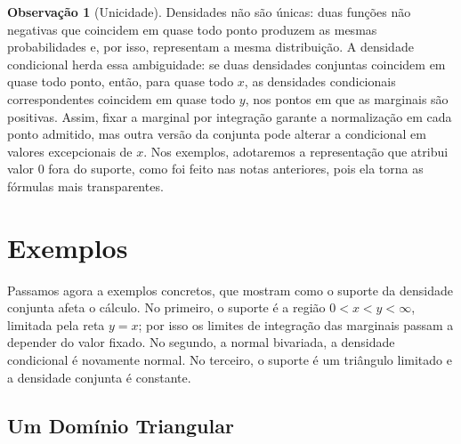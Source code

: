 \documentclass[12pt,portuguese]{article}
\theoremstyle{definition}
\newtheorem{remark}[remark]{Observação}
\theoremstyle{plainexercise}
\theoremstyle{starredexercise}
\theoremstyle{definition}
\begin{document}
\begin{remark}[Unicidade]\label{rem:unicidade-condicional}
  Densidades não são únicas: duas funções não negativas que coincidem em quase todo ponto
  produzem as mesmas probabilidades e, por isso, representam a mesma distribuição. A
  densidade condicional herda essa ambiguidade: se duas densidades conjuntas coincidem em
  quase todo ponto, então, para quase todo $x$, as densidades condicionais correspondentes
  coincidem em quase todo $y$, nos pontos em que as marginais são positivas.
  Assim, fixar a marginal por integração garante a normalização em cada ponto
  admitido, mas outra versão da conjunta pode alterar a condicional em valores
  excepcionais de $x$.
  Nos exemplos, adotaremos a representação que atribui valor
  $0$ fora do suporte, como foi feito nas notas anteriores, pois ela torna as fórmulas
  mais transparentes.
\end{remark}

\section{Exemplos}\label{sec:exemplos-condicionais}

Passamos agora a exemplos concretos, que mostram como o suporte da densidade conjunta
afeta o cálculo. No primeiro, o suporte é a região $0 < x < y < \infty$, limitada pela reta
$y = x$; por isso os limites de integração das marginais passam a depender do valor
fixado. No segundo, a normal bivariada, a densidade condicional é novamente normal. No
terceiro, o suporte é um triângulo limitado e a densidade conjunta é constante.

\subsection{Um Domínio Triangular}\label{subsec:dominio-triangular}
\end{document}
